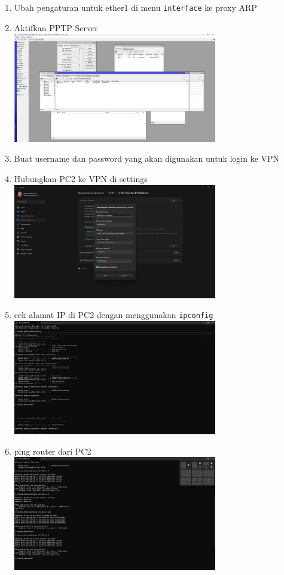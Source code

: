 \begin{enumerate}
	\item Ubah pengaturan untuk ether1 di menu \texttt{interface} ke proxy ARP\\
	\item Aktifkan PPTP Server\\
	\includegraphics[width=0.7\textwidth]{P5/img/ptpn.jpg}
	\item Buat username dan password yang akan digunakan untuk login ke VPN\\
	\item Hubungkan PC2 ke VPN di settings\\
	\includegraphics[width=0.7\textwidth]{P5/img/vpn.jpg}
	\item cek alamat IP di PC2 dengan menggunakan \texttt{ipconfig}\\
	\includegraphics[width=0.7\textwidth]{P5/img/ipconfig.jpg}
	\item ping router dari PC2\\
	\includegraphics[width=0.7\textwidth]{P5/img/ping3.jpg}
\end{enumerate}
